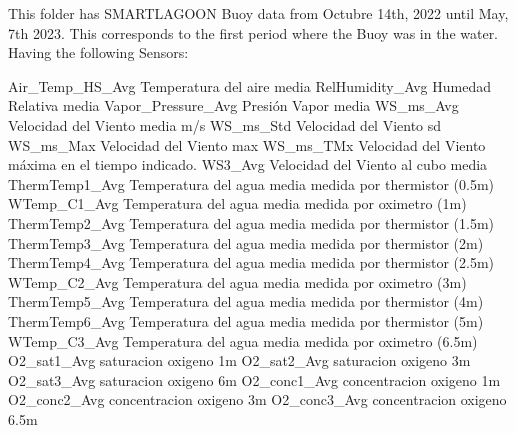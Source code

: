 This folder has SMARTLAGOON Buoy data from Octubre 14th, 2022 until May, 7th 2023. 
This corresponds to the first period where the Buoy was in the water. Having the following Sensors: 

Air_Temp_HS_Avg	 Temperatura del aire media
RelHumidity_Avg	 Humedad Relativa media
Vapor_Pressure_Avg	 Presión Vapor media
WS_ms_Avg	 Velocidad del Viento media m/s
WS_ms_Std	 Velocidad del Viento sd
WS_ms_Max	 Velocidad del Viento max
WS_ms_TMx	 Velocidad del Viento máxima en el tiempo indicado. 
WS3_Avg	 Velocidad del Viento al cubo media
ThermTemp1_Avg	Temperatura del agua media medida por thermistor (0.5m)
WTemp_C1_Avg	Temperatura del agua media medida por oximetro (1m)
ThermTemp2_Avg	Temperatura del agua media medida por thermistor (1.5m)
ThermTemp3_Avg	Temperatura del agua media medida por thermistor (2m)
ThermTemp4_Avg	Temperatura del agua media medida por thermistor (2.5m)
WTemp_C2_Avg	Temperatura del agua media medida por oximetro (3m)
ThermTemp5_Avg	Temperatura del agua media medida por thermistor (4m)
ThermTemp6_Avg	Temperatura del agua media medida por thermistor (5m)
WTemp_C3_Avg	Temperatura del agua media medida por oximetro (6.5m)
O2_sat1_Avg	saturacion oxigeno 1m
O2_sat2_Avg	saturacion oxigeno 3m
O2_sat3_Avg	saturacion oxigeno 6m
O2_conc1_Avg	concentracion oxigeno 1m
O2_conc2_Avg	concentracion oxigeno 3m
O2_conc3_Avg	concentracion oxigeno 6.5m



